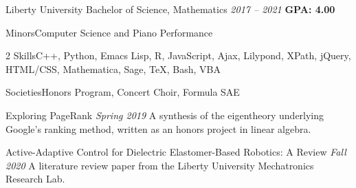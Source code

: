 \documentclass{awesome-cv}
\newcommand*{\lmr}{\fontfamily{lmr}\selectfont}
\renewcommand*{\bodyfont}{\lmr}
\newcommand{\bodyfontsize}{\fontsize{10.5pt}{1em}}
\renewcommand*{\entrydatestyle}[1]{{\bodyfontsize\bodyfont\slshape\color{graytext} #1}}
\begin{document}
\makecvheader[C]



\begin{cventries}
  \cventry
  {Liberty University}
  {Bachelor of Science, Mathematics}
  {\entrydatestyle{2017 -- 2021}}
  {\textbf{GPA: 4.00}}
  {
    \begin{cvlabeleditems}
    \item{Minors}{Computer Science and Piano Performance}
    \item[2]{Skills}{C++, Python, Emacs Lisp, R, JavaScript, Ajax, Lilypond,
        XPath, jQuery, HTML/CSS, Mathematica, Sage, \TeX{}, Bash, VBA}
    \item{Societies}{Honors Program, Concert Choir, Formula SAE}
    \end{cvlabeleditems}
  }
\end{cventries}



\begin{cventries}
  \cventry
  {Exploring PageRank}
  {}
  {\entrydatestyle{Spring 2019}}
  {}
  {
    A synthesis of the eigentheory underlying Google's ranking method, written as an honors project in linear algebra.
  }


  \cventry
  {Active-Adaptive Control for Dielectric Elastomer-Based Robotics: A Review}
  {}
  {\entrydatestyle{Fall 2020}}
  {}
  {A literature review paper from the Liberty University Mechatronics Research Lab.}
\end{cventries}


\end{document}
